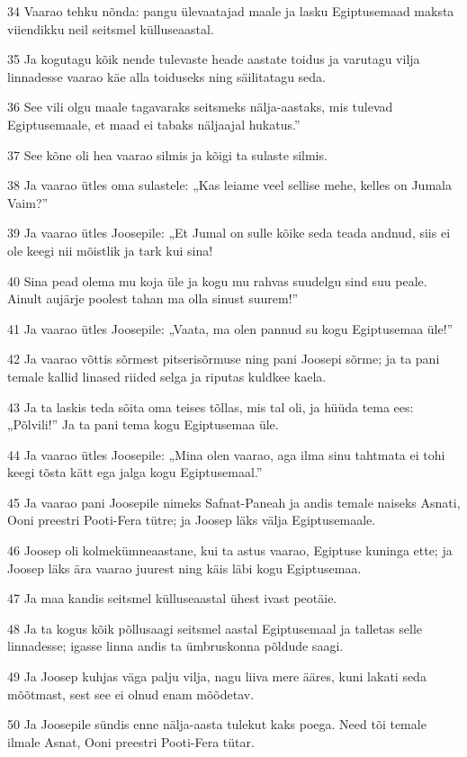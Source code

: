 \par 34 Vaarao tehku nõnda: pangu ülevaatajad maale ja lasku Egiptusemaad maksta viiendikku neil seitsmel külluseaastal.
\par 35 Ja kogutagu kõik nende tulevaste heade aastate toidus ja varutagu vilja linnadesse vaarao käe alla toiduseks ning säilitatagu seda.
\par 36 See vili olgu maale tagavaraks seitsmeks nälja-aastaks, mis tulevad Egiptusemaale, et maad ei tabaks näljaajal hukatus.”
\par 37 See kõne oli hea vaarao silmis ja kõigi ta sulaste silmis.
\par 38 Ja vaarao ütles oma sulastele: „Kas leiame veel sellise mehe, kelles on Jumala Vaim?”
\par 39 Ja vaarao ütles Joosepile: „Et Jumal on sulle kõike seda teada andnud, siis ei ole keegi nii mõistlik ja tark kui sina!
\par 40 Sina pead olema mu koja üle ja kogu mu rahvas suudelgu sind suu peale. Ainult aujärje poolest tahan ma olla sinust suurem!”
\par 41 Ja vaarao ütles Joosepile: „Vaata, ma olen pannud su kogu Egiptusemaa üle!”
\par 42 Ja vaarao võttis sõrmest pitserisõrmuse ning pani Joosepi sõrme; ja ta pani temale kallid linased riided selga ja riputas kuldkee kaela.
\par 43 Ja ta laskis teda sõita oma teises tõllas, mis tal oli, ja hüüda tema ees: „Põlvili!” Ja ta pani tema kogu Egiptusemaa üle.
\par 44 Ja vaarao ütles Joosepile: „Mina olen vaarao, aga ilma sinu tahtmata ei tohi keegi tõsta kätt ega jalga kogu Egiptusemaal.”
\par 45 Ja vaarao pani Joosepile nimeks Safnat-Paneah ja andis temale naiseks Asnati, Ooni preestri Pooti-Fera tütre; ja Joosep läks välja Egiptusemaale.
\par 46 Joosep oli kolmekümneaastane, kui ta astus vaarao, Egiptuse kuninga ette; ja Joosep läks ära vaarao juurest ning käis läbi kogu Egiptusemaa.
\par 47 Ja maa kandis seitsmel külluseaastal ühest ivast peotäie.
\par 48 Ja ta kogus kõik põllusaagi seitsmel aastal Egiptusemaal ja talletas selle linnadesse; igasse linna andis ta ümbruskonna põldude saagi.
\par 49 Ja Joosep kuhjas väga palju vilja, nagu liiva mere ääres, kuni lakati seda mõõtmast, sest see ei olnud enam mõõdetav.
\par 50 Ja Joosepile sündis enne nälja-aasta tulekut kaks poega. Need tõi temale ilmale Asnat, Ooni preestri Pooti-Fera tütar.
